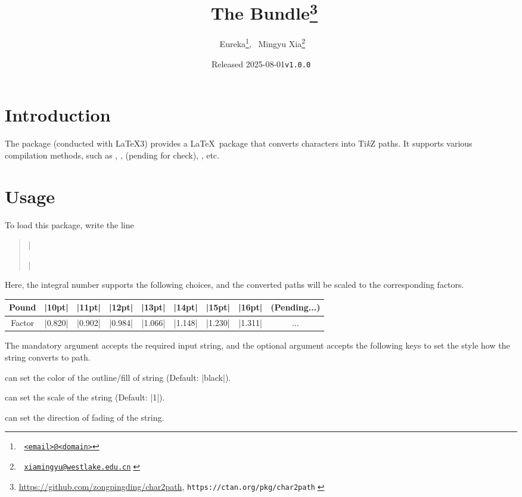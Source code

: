 \documentclass{l3doc}
\title{^^A
  The \pkg{char2path} Bundle\thanks{%
    \url{https://github.com/zongpingding/char2path},
    \texttt{https://ctan.org/pkg/char2path}^^A
  }^^A
}
\author{^^A
  Eureka\thanks{^^A
    \href{mailto:<email>@<domain>}{\texttt{<email>@<domain>}}},~
  Mingyu Xia\thanks{^^A
    \href{mailto:xiamingyu@westlake.edu.cn}{\texttt{xiamingyu@westlake.edu.cn}}^^A
  }^^A
}
\date{Released 2025-08-01\quad \texttt{v1.0.0}}
\begin{document}
\maketitle

\begin{documentation}

\section{Introduction}

The  package (conducted with \LaTeX3) provides
a \LaTeX\ package that converts characters into Ti\textit k\/Z paths.
It supports various compilation methods, such as ,
,  (pending for check), , etc.

\section{Usage}

To load this package, write the line
\begin{quote}
  |\usepackage[scale = ||pt]{num2path}|
\end{quote}

Here, the integral number  supports the following choices,
and the converted paths will be scaled to the corresponding factors.

\begin{center}
  \begin{tabular}{*9c}
    \toprule
    Pound   & |10pt|  & |11pt|  & |12pt|  &
    |13pt|  & |14pt|  & |15pt|  & |16pt|  & (Pending...)\\
    \midrule
    Factor  & |0.820| & |0.902| & |0.984| &
    |1.066| & |1.148| & |1.230| & |1.311| & ...\\
    \bottomrule
  \end{tabular}
\end{center}

\begin{function}{\numtopath}
  \begin{syntax}
      
  \end{syntax}
  The mandatory argument accepts the required input string, and the optional
  argument accepts the following keys to set the style how the string converts
  to path.
  \begin{keyval}
    \item [\key{draw,fill}]  can set the color of the outline/fill of string
    (Default: |black|).
    \item [\key{scale}]  can set the scale of the string
    (Default: |1|).
    \item [\key{path fading}]  can set the direction of
    fading of the string.
  \end{keyval}
\end{function}


\end{documentation}
\end{document}
